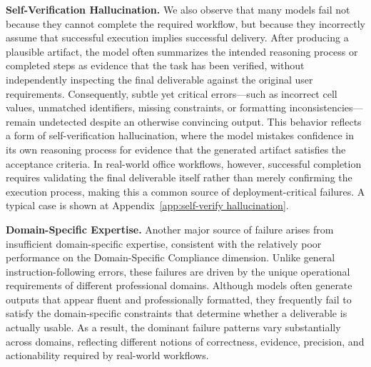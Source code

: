 \textbf{Self-Verification Hallucination.} We also observe that many models fail not because they cannot complete the required workflow, but because they incorrectly assume that successful execution implies successful delivery. After producing a plausible artifact, the model often summarizes the intended reasoning process or completed steps as evidence that the task has been verified, without independently inspecting the final deliverable against the original user requirements. Consequently, subtle yet critical errors—such as incorrect cell values, unmatched identifiers, missing constraints, or formatting inconsistencies—remain undetected despite an otherwise convincing output. This behavior reflects a form of self-verification hallucination, where the model mistakes confidence in its own reasoning process for evidence that the generated artifact satisfies the acceptance criteria. In real-world office workflows, however, successful completion requires validating the final deliverable itself rather than merely confirming the execution process, making this a common source of deployment-critical failures. A typical case is shown at Appendix~\ref{app:self-verify hallucination}.


\textbf{Domain-Specific Expertise.} Another major source of failure arises from insufficient domain-specific expertise, consistent with the relatively poor performance on the Domain-Specific Compliance dimension. Unlike general instruction-following errors, these failures are driven by the unique operational requirements of different professional domains. Although models often generate outputs that appear fluent and professionally formatted, they frequently fail to satisfy the domain-specific constraints that determine whether a deliverable is actually usable. As a result, the dominant failure patterns vary substantially across domains, reflecting different notions of correctness, evidence, precision, and actionability required by real-world workflows.

